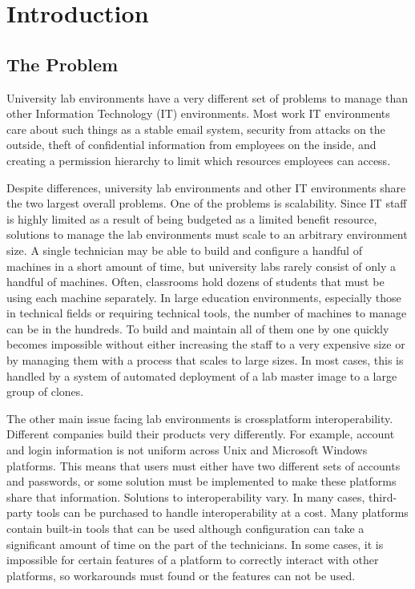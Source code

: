 \chapter{Introduction} \label{ch:introduction}
\section{The Problem} \label{sec:the_problem}
University lab environments have a very different set of problems to manage than other Information Technology (IT) environments.  Most work IT environments care about such things as a stable email system, security from attacks on the outside, theft of confidential information from employees on the inside, and creating a permission hierarchy to limit which resources employees can access.  



Despite differences, university lab environments and other IT environments share the two largest overall problems.  One of the problems is scalability.  Since IT staff is highly limited as a result of being budgeted as a limited benefit resource, solutions to manage the lab environments must scale to an arbitrary environment size.  A single technician may be able to build and configure a handful of machines in a short amount of time, but university labs rarely consist of only a handful of machines.  Often, classrooms hold dozens of students that must be using each machine separately.  In large education environments, especially those in technical fields or requiring technical tools, the number of machines to manage can be in the hundreds.  To build and maintain all of them one by one quickly becomes impossible without either increasing the staff to a very expensive size or by managing them with a process that scales to large sizes.  In most cases, this is handled by a system of automated deployment of a lab master image to a large group of clones. 

The other main issue facing lab environments is crossplatform interoperability.  Different companies build their products very differently.  For example, account and login information is not uniform across Unix and Microsoft Windows platforms.  This means that users must either have two different sets of accounts and passwords, or some solution must be implemented to make these platforms share that information.   Solutions to interoperability vary.  In many cases, third-party tools can be purchased to handle interoperability at a cost.  Many platforms contain built-in tools that can be used although configuration can take a significant amount of time on the part of the technicians.  In some cases, it is impossible for certain features of a platform to correctly interact with other platforms, so workarounds must found or the features can not be used. 

